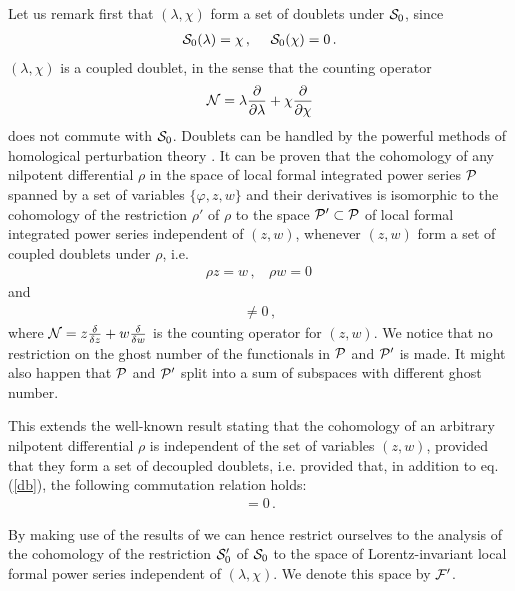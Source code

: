 \documentclass[a4paper,11pt]{article}
\begin{document}
Let us remark first that  
$(\lambda,\chi)$ form a set of doublets under ${\cal S}_0$,
since
%
\begin{eqnarray}
{\cal S}_0(\lambda) = \chi \, , ~~~~ {\cal S}_0(\chi) = 0 \, .
\label{a5_1}
\end{eqnarray}
%
$(\lambda,\chi)$ is  a coupled doublet,
in the sense that the counting operator
%
\begin{eqnarray}
{\cal N} = \lambda \frac{\partial}{\partial \lambda} +
           \chi \frac{\partial}{\partial \chi}
\label{a6}
\end{eqnarray}
%
does not commute with ${\cal S}_0$. 
Doublets can be handled by the powerful methods of homological
perturbation theory \cite{Henneaux:ig,Barnich:db,Barnich:mt,Barnich:2000zw}.
It can be proven \cite{Barnich:db,Barnich:mt,doppietti} that the cohomology of 
any nilpotent differential $\rho$ 
in the space of local formal integrated power series ${\cal P}$ 
spanned by a set of variables $\{\varphi,z,w\}$
and their derivatives
is isomorphic to the
cohomology of the restriction 
${\rho '}$
of 
$\rho$
to the space ${\cal P}' \subset {\cal P}$ of 
local formal integrated power series independent of 
$(z,w)$, whenever $(z,w)$ form a set of coupled 
doublets under $\rho$, i.e.
%
\begin{eqnarray}
\rho z = w \, , ~~~~ \rho w =0 \,
\label{db}
\end{eqnarray}
% 
and 
%
\begin{eqnarray}
[{\cal N},\rho] \neq 0 \, ,
\label{nc}
\end{eqnarray}
%
where ${\cal N} = z \frac{\delta}{\delta z} + w \frac{\delta}{\delta w}$
is the counting operator for $(z,w)$.
We notice that no restriction on the ghost number of the functionals
in ${\cal P}$ and ${\cal P}'$ is made. It might also happen that
${\cal P}$ and ${\cal P}'$ split into a sum of subspaces with different
ghost number.

This extends the well-known result \cite{Piguet:er,Barnich:2000zw}
stating that 
the cohomology of an arbitrary nilpotent differential $\rho$ is independent
of the set of variables $(z,w)$, provided that they form a set
of decoupled doublets, i.e. provided that, in addition to eq.(\ref{db}),
the following commutation relation holds:
%
\begin{eqnarray}
[{\cal N},\rho] = 0 \, .
\label{a6_1}
\end{eqnarray}
%



By making use of the results of
\cite{Barnich:db,Barnich:mt,doppietti}
 we can hence restrict ourselves to the analysis
of the cohomology of the restriction ${\cal S}'_0$ of
${\cal S}_0$ to the space of Lorentz-invariant local formal power
series independent of $(\lambda,\chi)$. We denote this space
by ${\cal F}'$.
\end{document}

